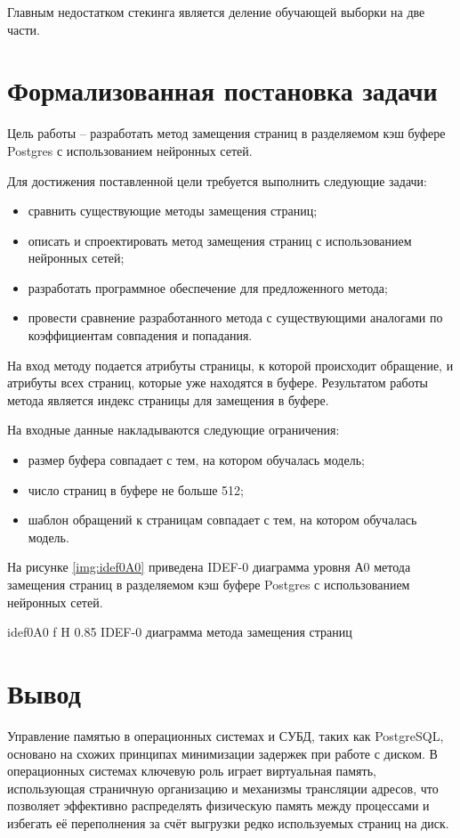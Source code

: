 Главным недостатком стекинга является деление обучающей выборки на две части.

\section{Формализованная постановка задачи}
Цель работы -- разработать метод замещения страниц в разделяемом кэш буфере Postgres с использованием нейронных сетей.

Для достижения поставленной цели требуется выполнить следующие задачи:
\begin{itemize}
	\item сравнить существующие методы замещения страниц;
	\item описать и спроектировать метод замещения страниц с использованием нейронных сетей;
	\item разработать программное обеспечение для предложенного метода;
	\item провести сравнение разработанного метода с существующими аналогами по коэффициентам совпадения и попадания.
\end{itemize}

На вход методу подается атрибуты страницы, к которой происходит обращение, и атрибуты всех страниц, которые уже находятся в буфере.
Результатом работы метода является индекс страницы для замещения в буфере.

На входные данные накладываются следующие ограничения:
\begin{itemize}
	\item размер буфера совпадает с тем, на котором обучалась модель;
	\item число страниц в буфере не больше 512;
	\item шаблон обращений к страницам совпадает с тем, на котором обучалась модель.
\end{itemize}

На рисунке \ref{img:idef0A0} приведена IDEF-0 диаграмма уровня А0 метода замещения страниц в разделяемом кэш буфере Postgres с использованием нейронных сетей.

{idef0A0} %
{f} %
{H} %
{0.85\textwidth} %
{IDEF-0 диаграмма метода замещения страниц} %

\section{Вывод}
Управление памятью в операционных системах и СУБД, таких как PostgreSQL, основано на схожих принципах минимизации задержек при работе с диском.
В операционных системах ключевую роль играет виртуальная память, использующая страничную организацию и механизмы трансляции адресов, что позволяет эффективно распределять физическую память между процессами и избегать её переполнения за счёт выгрузки редко используемых страниц на диск. 

